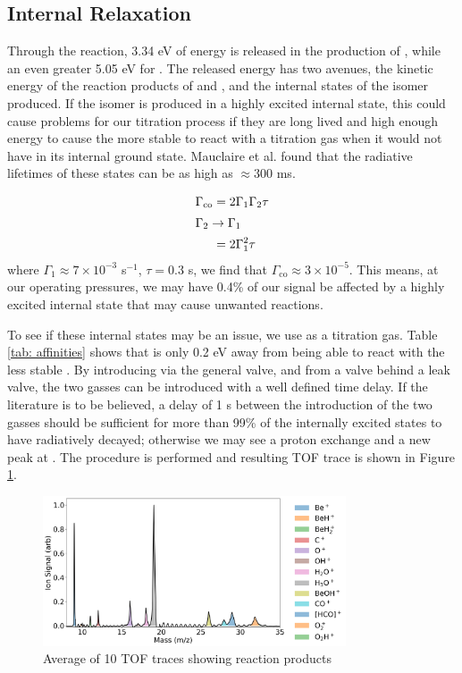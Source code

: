 \subsection{Internal Relaxation}

Through the  reaction, 3.34 eV of energy is released in the production of , while an even greater 5.05 eV for . The released energy has two avenues, the kinetic energy of the reaction products of \ce{[HCO]+} and , and the internal states of the isomer produced. If the isomer is produced in a highly excited internal state, this could cause problems for our titration process if they are long lived and high enough energy to cause the more stable  to react with a titration gas  when it would not have in its internal ground state. Mauclaire et al. found that the radiative lifetimes of these states can be as high as $\approx 300$ ms.\cite{Mauclaire1995}

\begin{align*}
	\Gamma_{\mathrm{co}} & = 2 \Gamma_1 \Gamma_2 \tau \\
	\intertext{$\Gamma_2 \rightarrow \Gamma_1$}
	& = 2\Gamma_1^2 \tau
\end{align*}
where $\Gamma_1 \approx 7 \times 10^{-3}$ s$^{-1}$, $\tau=0.3$ s, we find that $\Gamma_{\mathrm{co}} \approx 3 \times 10^{-5}$. This means, at our operating pressures, we may have 0.4\% of our signal be affected by a highly excited internal state that may cause unwanted reactions.

To see if these internal states may be an issue, we use  as a titration gas. Table \ref{tab: affinities} shows that  is only 0.2 eV away from being able to react with the less stable . By introducing  via the general valve, and  from a valve behind a leak valve, the two gasses can be introduced with a well defined time delay. If the literature is to be believed, a delay of 1 s between the introduction of the two gasses should be sufficient for more than 99\% of the internally excited states to have radiatively decayed; otherwise we may see a proton exchange and a new peak at . The procedure is performed and resulting TOF trace is shown in Figure \ref{fig: O2 titration}.

\begin{figure}
	\centering
	\includegraphics[width=0.8\textwidth]{images/O2_titration.png}
	\caption{Average of 10 TOF traces showing reaction products}
	\label{fig: O2 titration}
\end{figure}

